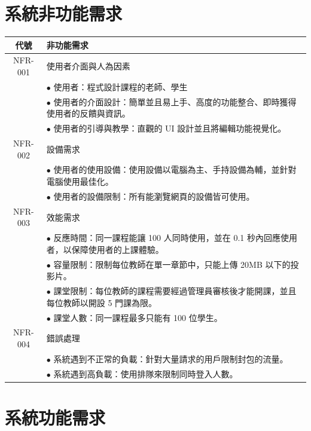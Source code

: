 \documentclass[12pt]{article}
\begin{document}
\section{系統非功能需求}
\begin{table}[H]
  \centering
  \begin{tabular}{|c|p{14.5cm}|}
    \hline
    \textbf{代號} & \textbf{非功能需求} \\
    \hline
    NFR-001 & 使用者介面與人為因素 \\ 
    & $\bullet$ 使用者：程式設計課程的老師、學生 \\
    & $\bullet$ 使用者的介面設計：簡單並且易上手、高度的功能整合、即時獲得使用者的反饋與資訊。 \\
    & $\bullet$ 使用者的引導與教學：直觀的 UI 設計並且將編輯功能視覺化。\\
    \hline
    NFR-002 & 設備需求 \\
    & $\bullet$ 使用者的使用設備：使用設備以電腦為主、手持設備為輔，並針對電腦使用最佳化。\\
    & $\bullet$ 使用者的設備限制：所有能瀏覽網頁的設備皆可使用。\\
    \hline
    NFR-003 & 效能需求 \\
    & $\bullet$ 反應時間：同一課程能讓 100 人同時使用，並在 0.1 秒內回應使用者，以保障使用者的上課體驗。\\
    & $\bullet$ 容量限制：限制每位教師在單一章節中，只能上傳 20MB 以下的投影片。\\
    & $\bullet$ 課堂限制：每位教師的課程需要經過管理員審核後才能開課，並且每位教師以開設 5 門課為限。\\
    & $\bullet$ 課堂人數：同一課程最多只能有 100 位學生。\\
    \hline
    NFR-004 & 錯誤處理 \\
    & $\bullet$ 系統遇到不正常的負載：針對大量請求的用戶限制封包的流量。\\
    & $\bullet$ 系統遇到高負載：使用排隊來限制同時登入人數。\\
    \hline
  \end{tabular}
\end{table}

\section{系統功能需求}
\end{document}
